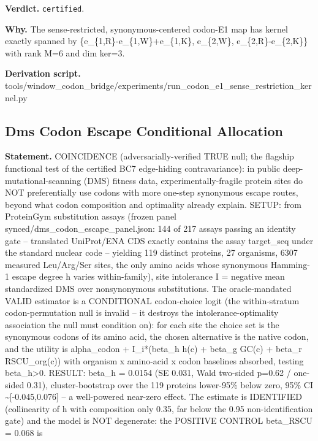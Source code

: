 \textbf{Verdict.} \texttt{certified}.

\textbf{Why.} The sense-restricted, synonymous-centered codon-E1 map has kernel exactly spanned by
\{e\_\{1,R\}-e\_\{1,W\}+e\_\{1,K\}, e\_\{2,W\}, e\_\{2,R\}-e\_\{2,K\}\} with rank M=6 and dim ker=3.

\textbf{Derivation script.} tools/window\_codon\_bridge/experiments/run\_codon\_e1\_sense\_restriction\_kernel.py

\subsection{Dms Codon Escape Conditional Allocation}\label{sec:bridge-dms-codon-escape-conditional-allocation}
\textbf{Statement.} COINCIDENCE (adversarially-verified TRUE null; the flagship functional test of the certified BC7
edge-hiding contravariance): in public deep-mutational-scanning (DMS) fitness data,
experimentally-fragile protein sites do NOT preferentially use codons with more one-step synonymous
escape routes, beyond what codon composition and optimality already explain. SETUP: from ProteinGym
substitution assays (frozen panel synced/dms\_codon\_escape\_panel.json: 144 of 217 assays passing
an identity gate -- translated UniProt/ENA CDS exactly contains the assay target\_seq under the
standard nuclear code -- yielding 119 distinct proteins, 27 organisms, 6307 measured Leu/Arg/Ser
sites, the only amino acids whose synonymous Hamming-1 escape degree h varies within-family), site
intolerance I = negative mean standardized DMS over nonsynonymous substitutions. The oracle-mandated
VALID estimator is a CONDITIONAL codon-choice logit (the within-stratum codon-permutation null is
invalid -- it destroys the intolerance-optimality association the null must condition on): for each
site the choice set is the synonymous codons of its amino acid, the chosen alternative is the native
codon, and the utility is alpha\_codon + I\_i*(beta\_h h(c) + beta\_g GC(c) + beta\_r RSCU\_org(c))
with organism x amino-acid x codon baselines absorbed, testing beta\_h>0. RESULT: beta\_h = 0.0154
(SE 0.031, Wald two-sided p=0.62 / one-sided 0.31), cluster-bootstrap over the 119 proteins
lower-95\% below zero, 95\% CI \textasciitilde{}[-0.045,0.076] -- a well-powered near-zero effect.
The estimate is IDENTIFIED (collinearity of h with composition only 0.35, far below the 0.95
non-identification gate) and the model is NOT degenerate: the POSITIVE CONTROL beta\_RSCU = 0.068 is
